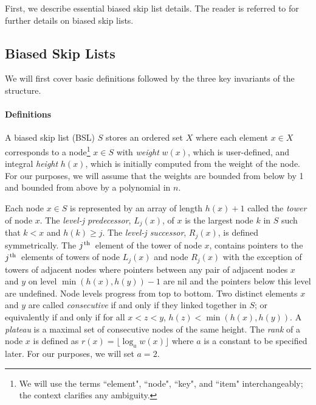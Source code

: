 \documentclass[11pt]{article}
\newcommand{\ens}[1]{\ensuremath{#1}}
\newcommand{\jth}{\ens{j^{\mbox{\hspace{.2mm}\scriptsize th}}}}
\newcommand{\nodeheight}[1]{\ensuremath{h(#1)}}
\newcommand{\nodeweight}[1]{{\ensuremath{w(\node #1)}}}
\newcommand{\noderank}[1]{\ensuremath{r(\node #1)}}
\newcommand{\node}[1]{\ensuremath{#1}}
\newcommand{\set}[1]{\ensuremath{#1}}
\newcommand{\bsl}[1]{\ensuremath{#1}}
\newcommand{\lvlpre}[2]{\ensuremath{L_{#1}(#2)}}
\newcommand{\lvlsuc}[2]{\ensuremath{R_{#1}(#2)}}
\begin{document}
First, we describe essential biased skip list details. The reader is referred to \cite{journals/algorithmica/BagchiBG05} for further details on biased skip lists. 


\subsection{Biased Skip Lists} 
\label{subsec:BSLBSL} 

 
We will first cover basic definitions followed by the three key invariants of the structure. 
 

\paragraph{Definitions} 
A biased skip list (BSL) $\bsl S$ stores an ordered set $\set X$ where each element $x\in X$ corresponds to a node\footnote{We will use the terms ``element", ``node", ``key", and ``item" interchangeably; the context clarifies any ambiguity.} $\node x\in \bsl S$ with \textit{weight} $\nodeweight x$, which is user-defined, and integral \textit{height} $\nodeheight x$, which is initially computed from the weight of the node. For our purposes, we will assume that the weights are bounded from below by 1 and bounded from above by a polynomial in $n$. 

Each node $\node x \in \bsl S$ is represented by an array of length $\nodeheight x +1$ called the \textit{tower} of node \node x. The \textit{level-j predecessor}, \lvlpre{j}{x}, of $x$ is the largest node $\node k$ in \bsl S such that $\node k<x$ and $\nodeheight k \geq \node j$. The \textit{level-j successor}, \lvlsuc{j}{x}, is defined symmetrically. The \jth\ element of the tower of node \node x, contains pointers to the \jth\ elements of towers of node \lvlpre{j}{x} and node \lvlsuc{j}{x} with the exception of towers of adjacent nodes where pointers between any pair of adjacent nodes $x$ and $y$ on level $\min(\nodeheight x,\nodeheight{y})-1$ are nil and the pointers below this level are undefined. Node levels progress from top to bottom. Two distinct elements $\node x$ and $\node y$ are called \textit{consecutive} if and only if they linked together in $\set S$; or equivalently if and only if for all $\node x<\node z<\node y$, $\nodeheight z< \min(\nodeheight x,\nodeheight y)$. A \textit{plateau} is a maximal set of consecutive nodes of the same height. The \textit{rank} of a node \node x is defined as $\noderank x = \lfloor\log_a \nodeweight x \rfloor$ where $a$ is a constant to be specified later. For our purposes, we will set $a=2$. 
\end{document}
